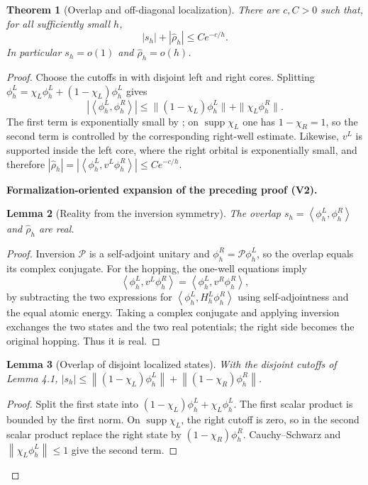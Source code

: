 \documentclass[11pt]{article}
\newtheorem{theorem}{Theorem}[section]
\newtheorem{lemma}[theorem]{Lemma}
\newcommand{\formalisationparentid}{X}
\newenvironment{formalisationaddition}[1]{\par\medskip\begingroup\color{blue}\def\formalisationparentid{#1}\setcounter{formalizationsublemma}{0}\let\lemma\formalizationsublemma\let\endlemma\endformalizationsublemma
  \def\Eo{\mathcal E_h^\circ}\def\EE{\mathcal E_h}\def\phio{\phi_h^\circ}\def\phih{\phi_h}\def\Ho{H_h^{\rm atom}(v^\circ)}\def\Ha{H_h^{\rm atom}}\def\HL{H_h^{L}}\def\Dh{D_h}\def\Log{\operatorname{Log}}\def\ellh{\ell_h}\def\Gp{G_{p,h}}\def\Ast{A_{*,h}}\def\ahat{\widehat{\mathfrak a}_h}\def\ah{\mathfrak a_h}\def\rh{\widehat\rho_h}\def\deltah{\widehat\delta_h}\def\oldref##1{\textup{(##1)}}\def\interface##1{\par\noindent\textit{Analytical interface used here.} ##1\par}\def\finish{\par\noindent\textit{Conclusion of the formalization-oriented expansion.} }\par\noindent\textbf{Formalization-oriented expansion of the preceding proof (V2).}\par\smallskip
}{\par\endgroup\medskip
}
\newcommand{\norm}[1]{\left\|#1\right\|}
\newcommand{\ip}[2]{\left\langle #1,#2\right\rangle}
\newcommand{\supp}{\operatorname{supp}}
\begin{document}
\begin{theorem}[Overlap and off-diagonal localization]\label{thm:overlap-ledger}
There are $c,C>0$ such that, for all sufficiently small $h$,
\begin{equation}\label{eq:overlap-small}
 |s_h|+|\widehat\rho_h|\le Ce^{-c/h}.
\end{equation}
In particular $s_h=o(1)$ and $\widehat\rho_h=o(h)$.
\end{theorem}
\begin{proof}
Choose the cutoffs in  with disjoint left and
right cores.  Splitting $\phi_h^L=\chi_L\phi_h^L+(1-\chi_L)\phi_h^L$ gives
\[
 |\ip{\phi_h^L}{\phi_h^R}|
 \le \|(1-\chi_L)\phi_h^L\|+\|\chi_L\phi_h^R\|.
\]
The first term is exponentially small by ;
on $\supp\chi_L$ one has $1-\chi_R=1$, so the second term is controlled by
the corresponding right-well estimate.  Likewise, $v^L$ is supported inside
the left core, where the right orbital is exponentially small, and therefore
$|\widehat\rho_h|=|\ip{\phi_h^L}{v^L\phi_h^R}|\le Ce^{-c/h}$.

\begin{formalisationaddition}{T4.3}
\begin{lemma}[Reality from the inversion symmetry]\label{sublemma:T4-3-reality}
The overlap $s_h=\ip{\phi_h^L}{\phi_h^R}$ and $\rh$ are real.
\end{lemma}
\begin{proof}
Inversion $\mathcal P$ is a self-adjoint unitary and $\phi_h^R=\mathcal P\phi_h^L$, so the overlap equals its complex conjugate. For the hopping, the one-well equations imply
\[
 \ip{\phi_h^L}{v^L\phi_h^R}
 =\ip{\phi_h^L}{v^R\phi_h^R},
\]
by subtracting the two expressions for $\ip{\phi_h^L}{\HL\phi_h^R}$ using self-adjointness and the equal atomic energy. Taking a complex conjugate and applying inversion exchanges the two states and the two real potentials; the right side becomes the original hopping. Thus it is real.
\end{proof}

\begin{lemma}[Overlap of disjoint localized states]\label{sublemma:T4-3-overlap-bound}
With the disjoint cutoffs of Lemma 4.1,
$|s_h|\le\norm{(1-\chi_L)\phi_h^L}+\norm{(1-\chi_R)\phi_h^R}$.
\end{lemma}
\begin{proof}
Split the first state into $(1-\chi_L)\phi_h^L+\chi_L\phi_h^L$. The first scalar product is bounded by the first norm. On $\supp\chi_L$, the right cutoff is zero, so in the second scalar product replace the right state by $(1-\chi_R)\phi_h^R$. Cauchy--Schwarz and $\norm{\chi_L\phi_h^L}\le1$ give the second term.
\end{proof}


\end{formalisationaddition}
\end{proof}
\end{document}
